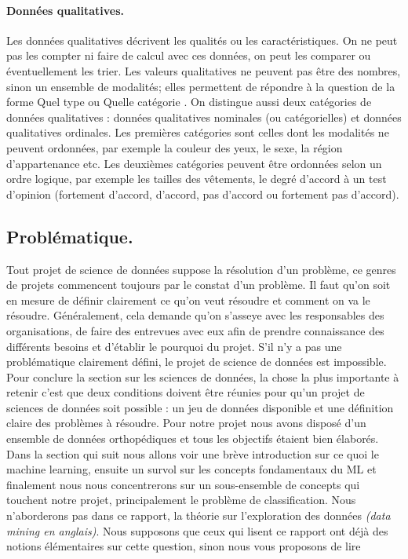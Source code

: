 \documentclass[12pt, french]{report}
\begin{document}
\paragraph{Données qualitatives.} 
Les données qualitatives décrivent les qualités ou les caractéristiques. On ne peut pas les compter ni faire de calcul avec ces données, on peut les comparer ou éventuellement les trier. Les valeurs qualitatives ne peuvent pas être des nombres, sinon un ensemble de modalités; elles permettent de répondre à la question de la forme \guillemotleft Quel type \guillemotright ou \guillemotleft Quelle catégorie \guillemotright. On distingue aussi deux catégories de données qualitatives : données qualitatives nominales (ou catégorielles) et données qualitatives ordinales. Les premières catégories sont celles dont les modalités ne peuvent ordonnées, par exemple la couleur des yeux, le sexe, la région d'appartenance etc. Les deuxièmes catégories peuvent être ordonnées selon un ordre logique, par exemple les tailles des vêtements, le degré d'accord à un test d'opinion (fortement d'accord, d'accord, pas d'accord ou fortement pas d'accord). \cite[p.~12]{key44}

\subsection{Problématique.}
Tout projet de science de données suppose la résolution d'un problème, ce genres de projets commencent toujours par le constat d'un problème. Il faut qu'on soit en mesure de définir clairement ce qu'on veut résoudre et comment on va le résoudre. Généralement, cela demande qu'on s'asseye avec les responsables des organisations, de faire des entrevues avec eux afin de prendre connaissance des différents besoins et d'établir le pourquoi du projet. S'il n'y a pas une problématique clairement défini, le projet de science de données est impossible. \\

Pour conclure la section sur les sciences de données, la chose la plus importante à retenir c'est que deux conditions doivent être réunies pour qu'un projet de sciences de données soit possible : un jeu de données disponible et une définition claire des problèmes à résoudre. Pour notre projet nous avons disposé d'un ensemble de données orthopédiques et tous les objectifs étaient bien élaborés. \\

Dans la section qui suit nous allons voir une brève introduction sur ce quoi le machine learning, ensuite un survol sur les concepts fondamentaux du ML et finalement nous nous concentrerons sur un sous-ensemble de concepts qui touchent notre projet, principalement le problème de classification. Nous n'aborderons pas dans ce rapport, la théorie sur l'exploration des données \textit{(data mining en anglais)}. Nous supposons que ceux qui lisent ce rapport ont déjà des notions élémentaires sur cette question, sinon nous vous proposons de lire \cite{key46, key47}
\end{document}
